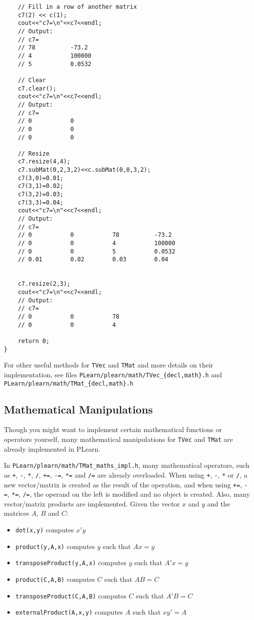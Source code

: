 \documentclass[11pt]{book}
\begin{document}
\begin{verbatim}
    // Fill in a row of another matrix
    c7(2) << c(1);
    cout<<"c7=\n"<<c7<<endl;
    // Output:
    // c7=
    // 78          -73.2
    // 4           100000
    // 5           0.0532

    // Clear
    c7.clear();
    cout<<"c7=\n"<<c7<<endl;
    // Output:
    // c7=
    // 0           0
    // 0           0
    // 0           0

    // Resize
    c7.resize(4,4);
    c7.subMat(0,2,3,2)<<c.subMat(0,0,3,2);
    c7(3,0)=0.01;
    c7(3,1)=0.02;
    c7(3,2)=0.03;
    c7(3,3)=0.04;
    cout<<"c7=\n"<<c7<<endl;
    // Output:
    // c7=
    // 0           0           78          -73.2
    // 0           0           4           100000
    // 0           0           5           0.0532
    // 0.01        0.02        0.03        0.04


    c7.resize(2,3);
    cout<<"c7=\n"<<c7<<endl;
    // Output:
    // c7=
    // 0           0           78
    // 0           0           4

    return 0;
}

\end{verbatim}


For other useful methods for \texttt{TVec} and
\texttt{TMat} and more details on their implementation,
see files \texttt{PLearn/plearn/math/TVec\_\{decl,math\}.h}
and \texttt{PLearn/plearn/math/TMat\_\{decl,math\}.h}

\subsection{Mathematical Manipulations}

Though you might want to implement certain mathematical functions or operators
yourself, many mathematical manipulations for \texttt{TVec}
and \texttt{TMat} are already implemented in PLearn. 

In \texttt{PLearn/plearn/math/TMat\_maths\_impl.h},
many mathematical operators, such as  \texttt{+}, \texttt{-}, \texttt{*}, 
\texttt{/}, \texttt{+=}, \texttt{-=}, \texttt{*=} and \texttt{/=} are already overloaded.
When using \texttt{+}, \texttt{-}, \texttt{*} or
\texttt{/}, a new vector/matrix is created as the result of the operation,
and when using \texttt{+=}, \texttt{-=}, \texttt{*=}, \texttt{/=}, the operand on
the left is modified and no object is created. Also, many vector/matrix products
are implemented. Given the vector $x$ and $y$ and the matrices $A$, $B$ and $C$:

\begin{itemize}
\item \texttt{dot(x,y)} computes $x' y$
\item \texttt{product(y,A,x)} computes $y$ such that $A x = y$
\item \texttt{transposeProduct(y,A,x)} computes $y$ such that $A' x = y$
\item \texttt{product(C,A,B)} computes $C$ such that $A B = C$
\item \texttt{transposeProduct(C,A,B)} computes $C$ such that $A' B = C$
\item \texttt{externalProduct(A,x,y)} computes $A$ such that $x y' = A$
\end{itemize}
\end{document}
